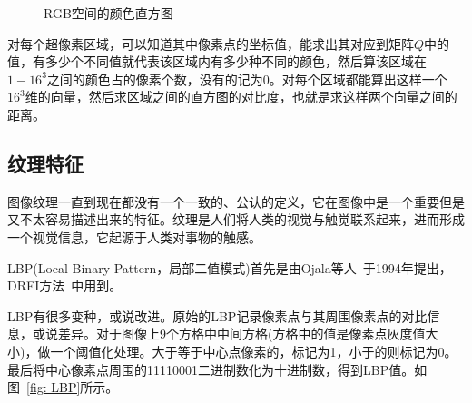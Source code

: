 \documentclass[12pt]{article}
\begin{document}
\begin{figure}
  \centering 
  \caption{RGB空间的颜色直方图}
  \label{fig: RGBhistogram} %
\end{figure}

对每个超像素区域，可以知道其中像素点的坐标值，能求出其对应到矩阵$Q$中的值，有多少个不同值就代表该区域内有多少种不同的颜色，然后算该区域在$1-16^3$之间的颜色占的像素个数，没有的记为0。对每个区域都能算出这样一个$16^3$维的向量，然后求区域之间的直方图的对比度，也就是求这样两个向量之间的距离。

\subsection{纹理特征}

图像纹理一直到现在都没有一个一致的、公认的定义，它在图像中是一个重要但是又不太容易描述出来的特征。纹理是人们将人类的视觉与触觉联系起来，进而形成一个视觉信息，它起源于人类对事物的触感。

LBP(Local Binary Pattern，局部二值模式)首先是由Ojala等人~\cite{ojala1994performance}于1994年提出，DRFI方法~\cite{jianghuaizu2013salient}中用到。

LBP有很多变种，或说改进。原始的LBP记录像素点与其周围像素点的对比信息，或说差异。对于图像上9个方格中中间方格(方格中的值是像素点灰度值大小)，做一个阈值化处理。大于等于中心点像素的，标记为1，小于的则标记为0。最后将中心像素点周围的11110001二进制数化为十进制数，得到LBP值。如图~\ref{fig: LBP}所示。
\end{document}
